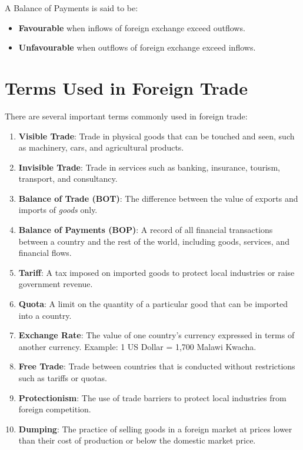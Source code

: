 \documentclass[12pt,a4paper, openany]{book}
\begin{document}
A Balance of Payments is said to be:
\begin{itemize}
	\item \textbf{Favourable} when inflows of foreign exchange exceed outflows.
	\item \textbf{Unfavourable} when outflows of foreign exchange exceed inflows.
\end{itemize}

\vspace{0.5cm}

\section{Terms Used in Foreign Trade}
There are several important terms commonly used in foreign trade:

\begin{enumerate}
	\item \textbf{Visible Trade}: Trade in physical goods that can be touched and seen, such as machinery, cars, and agricultural products.
	\item \textbf{Invisible Trade}: Trade in services such as banking, insurance, tourism, transport, and consultancy.
	\item \textbf{Balance of Trade (BOT)}: The difference between the value of exports and imports of \textit{goods} only.
	\item \textbf{Balance of Payments (BOP)}: A record of all financial transactions between a country and the rest of the world, including goods, services, and financial flows.
	\item \textbf{Tariff}: A tax imposed on imported goods to protect local industries or raise government revenue.
	\item \textbf{Quota}: A limit on the quantity of a particular good that can be imported into a country.
	\item \textbf{Exchange Rate}: The value of one country’s currency expressed in terms of another currency.
	      Example: 1 US Dollar = 1,700 Malawi Kwacha.
	\item \textbf{Free Trade}: Trade between countries that is conducted without restrictions such as tariffs or quotas.
	\item \textbf{Protectionism}: The use of trade barriers to protect local industries from foreign competition.
	\item \textbf{Dumping}: The practice of selling goods in a foreign market at prices lower than their cost of production or below the domestic market price.
\end{enumerate}


\backmatter

\nocite{*}
\printbibliography{}
\end{document}
